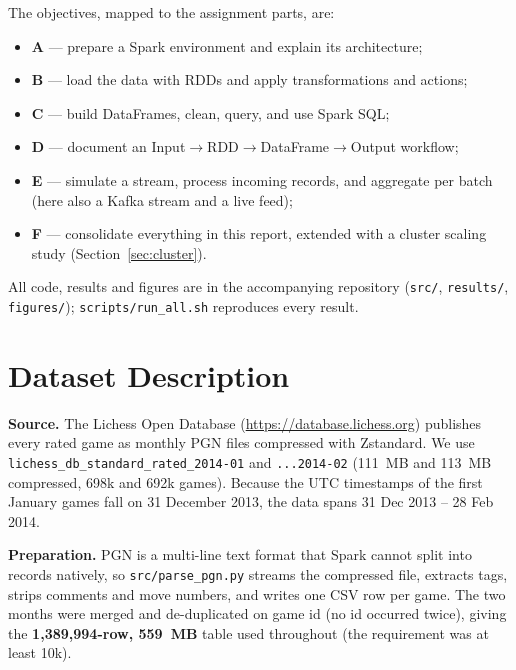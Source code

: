 \documentclass[11pt,a4paper]{article}
\begin{document}
The objectives, mapped to the assignment parts, are:
\begin{itemize}\itemsep0pt
\item \textbf{A} --- prepare a Spark environment and explain its architecture;
\item \textbf{B} --- load the data with RDDs and apply transformations and actions;
\item \textbf{C} --- build DataFrames, clean, query, and use Spark SQL;
\item \textbf{D} --- document an Input$\rightarrow$RDD$\rightarrow$DataFrame$\rightarrow$Output workflow;
\item \textbf{E} --- simulate a stream, process incoming records, and aggregate per batch (here also a Kafka stream and a live feed);
\item \textbf{F} --- consolidate everything in this report, extended with a cluster scaling study (Section~\ref{sec:cluster}).
\end{itemize}
All code, results and figures are in the accompanying repository
(\texttt{src/}, \texttt{results/}, \texttt{figures/}); \texttt{scripts/run\_all.sh} reproduces every result.

\section{Dataset Description}
\textbf{Source.} The Lichess Open Database
(\url{https://database.lichess.org}) publishes every rated game as monthly PGN files
compressed with Zstandard. We use \texttt{lichess\_db\_standard\_rated\_2014-01} and
\texttt{...2014-02} (111~MB and 113~MB compressed, 698k and 692k games).
Because the UTC timestamps of the first January games fall on 31 December 2013, the data
spans 31 Dec 2013 -- 28 Feb 2014.

\textbf{Preparation.} PGN is a multi-line text format that Spark cannot split into records
natively, so \texttt{src/parse\_pgn.py} streams the compressed file, extracts tags,
strips comments and move numbers, and writes one CSV row per game. The two months were
merged and de-duplicated on game id (no id occurred twice), giving the \textbf{1,389,994-row, 559~MB} table
used throughout (the requirement was at least 10k).
\end{document}
